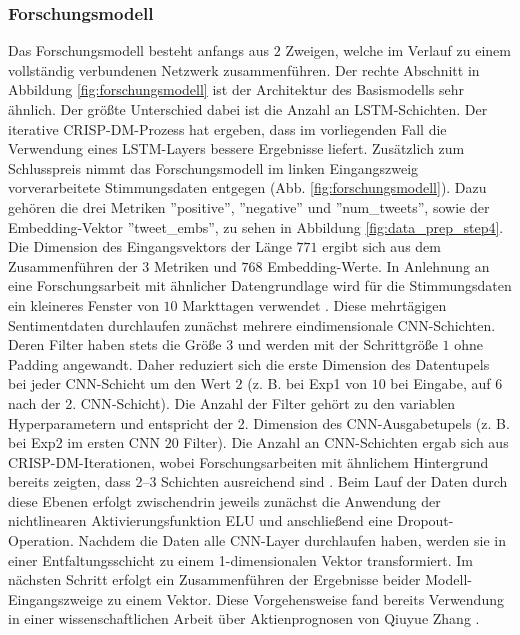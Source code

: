 \subsubsection{Forschungsmodell}\label{sec:modellierung_forsch}

Das Forschungsmodell besteht anfangs aus $2$ Zweigen, welche im Verlauf zu einem vollständig verbundenen Netzwerk zusammenführen. Der rechte Abschnitt in Abbildung \ref{fig:forschungsmodell} ist der Architektur des Basismodells sehr ähnlich. Der größte Unterschied dabei ist die Anzahl an \ac{LSTM}-Schichten. Der iterative \ac{CRISP-DM}-Prozess hat ergeben, dass im vorliegenden Fall die Verwendung eines \ac{LSTM}-Layers bessere Ergebnisse liefert.
Zusätzlich zum Schlusspreis nimmt das Forschungsmodell im linken Eingangszweig vorverarbeitete Stimmungsdaten entgegen (Abb. \ref{fig:forschungsmodell}). Dazu gehören die drei Metriken ''positive'', ''negative'' und ''num\_tweets'', sowie der Embedding-Vektor ''tweet\_embs'', zu sehen in Abbildung \ref{fig:data_prep_step4}. Die Dimension des Eingangsvektors der Länge $771$ ergibt sich aus dem Zusammenführen der $3$ Metriken und $768$ Embedding-Werte. In Anlehnung an eine Forschungsarbeit mit ähnlicher Datengrundlage wird für die Stimmungsdaten ein kleineres Fenster von $10$ Markttagen verwendet \autocite[Kap. 4.1]{zhang2022transformer}.
Diese mehrtägigen Sentimentdaten durchlaufen zunächst mehrere eindimensionale \ac{CNN}-Schichten. Deren Filter haben stets die Größe $3$ und werden mit der Schrittgröße $1$ ohne Padding angewandt. Daher reduziert sich die erste Dimension des Datentupels bei jeder \ac{CNN}-Schicht um den Wert $2$ (z. B. bei Exp1 von $10$ bei Eingabe, auf $6$ nach der 2. \ac{CNN}-Schicht). Die Anzahl der Filter gehört zu den variablen Hyperparametern und entspricht der 2. Dimension des \ac{CNN}-Ausgabetupels (z. B. bei Exp2 im ersten CNN $20$ Filter).
Die Anzahl an \ac{CNN}-Schichten ergab sich aus \ac{CRISP-DM}-Iterationen, wobei Forschungsarbeiten mit ähnlichem Hintergrund bereits zeigten, dass 2–3 Schichten ausreichend sind \autocite[Kap. 8.2]{guan2020stockprice}. Beim Lauf der Daten durch diese Ebenen erfolgt zwischendrin jeweils zunächst die Anwendung der nichtlinearen Aktivierungsfunktion \ac{ELU} und anschließend eine Dropout-Operation.
Nachdem die Daten alle \ac{CNN}-Layer durchlaufen haben, werden sie in einer Entfaltungsschicht zu einem 1-dimensionalen Vektor transformiert.
Im nächsten Schritt erfolgt ein Zusammenführen der Ergebnisse beider Modell-Eingangszweige zu einem Vektor. Diese Vorgehensweise fand bereits Verwendung in einer wissenschaftlichen Arbeit über Aktienprognosen von Qiuyue Zhang \autocite[Kap. 4.2.1]{zhang2022transformer}.
